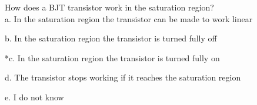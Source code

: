 
How does a BJT transistor work in the saturation region? \\

a. In the saturation region the transistor can be made to work linear

b. In the saturation region the transistor is turned fully off

*c. In the saturation region the transistor is turned fully on

d. The transistor stops working if it reaches the saturation region

e. I do not know \\ 
